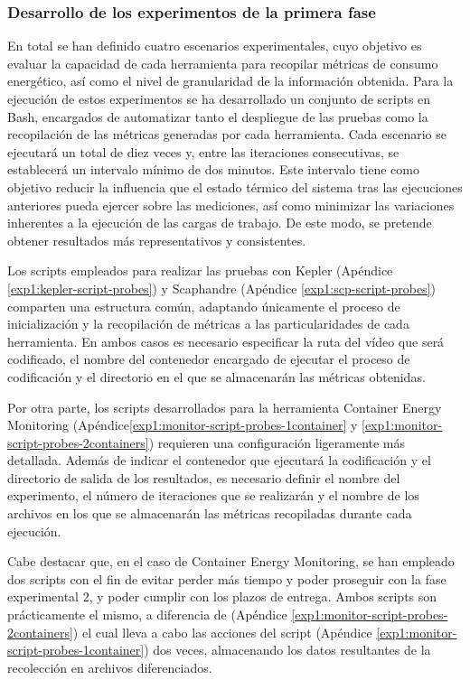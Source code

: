\subsubsection{Desarrollo de los experimentos de la primera fase}
 En total se han definido cuatro escenarios experimentales, cuyo objetivo es evaluar la capacidad de cada herramienta para recopilar métricas de consumo energético, así como el nivel de granularidad de la información obtenida. Para la ejecución de estos experimentos se ha desarrollado un conjunto de scripts en Bash, encargados de automatizar tanto el despliegue de las pruebas como la recopilación de las métricas generadas por cada herramienta. Cada escenario se ejecutará un total de diez veces y, entre las iteraciones consecutivas, se establecerá un intervalo mínimo de dos minutos. Este intervalo tiene como objetivo reducir la influencia que el estado térmico del sistema tras las ejecuciones anteriores pueda ejercer sobre las mediciones, así como minimizar las variaciones inherentes a la ejecución de las cargas de trabajo. De este modo, se pretende obtener resultados más representativos y consistentes.

 Los scripts empleados para realizar las pruebas con Kepler (Apéndice \ref{exp1:kepler-script-probes}) y Scaphandre (Apéndice \ref{exp1:scp-script-probes}) comparten una estructura común, adaptando únicamente el proceso de inicialización y la recopilación de métricas a las particularidades de cada herramienta. En ambos casos es necesario especificar la ruta del vídeo que será codificado, el nombre del contenedor encargado de ejecutar el proceso de codificación y el directorio en el que se almacenarán las métricas obtenidas.

 Por otra parte, los scripts desarrollados para la herramienta Container Energy Monitoring (Apéndice\ref{exp1:monitor-script-probes-1container} y \ref{exp1:monitor-script-probes-2containers}) requieren una configuración ligeramente más detallada. Además de indicar el contenedor que ejecutará la codificación y el directorio de salida de los resultados, es necesario definir el nombre del experimento, el número de iteraciones que se realizarán y el nombre de los archivos en los que se almacenarán las métricas recopiladas durante cada ejecución.

 Cabe destacar que, en el caso de Container Energy Monitoring, se han empleado dos scripts con el fin de evitar perder más tiempo y poder proseguir con la fase experimental 2, y poder cumplir con los plazos de entrega. Ambos scripts son prácticamente el mismo, a diferencia de (Apéndice \ref{exp1:monitor-script-probes-2containers}) el cual lleva a cabo las acciones del script (Apéndice \ref{exp1:monitor-script-probes-1container}) dos veces, almacenando los datos resultantes de la recolección en archivos diferenciados.


